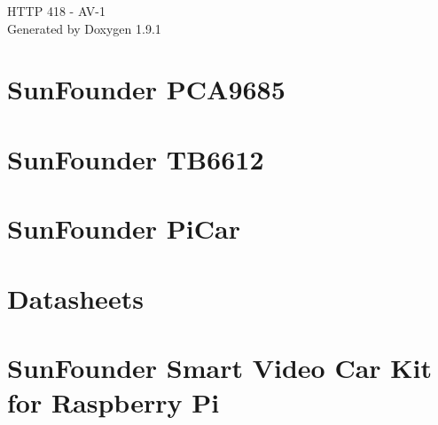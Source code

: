 \let\mypdfximage\pdfximage\def\pdfximage{\immediate\mypdfximage}\documentclass[twoside]{book}
\newcommand{\+}{\discretionary{\mbox{\scriptsize$\hookleftarrow$}}{}{}}
\newcommand{\clearemptydoublepage}{%
  \newpage{\pagestyle{empty}\cleardoublepage}%
}
\begin{document}
\raggedbottom

\hypersetup{pageanchor=false,
             bookmarksnumbered=true,
             pdfencoding=unicode
            }
\begin{titlepage}
\vspace*{7cm}
\begin{center}%
{\Large HTTP 418 -\/ AV-\/1 }\\
\vspace*{1cm}
{\large Generated by Doxygen 1.9.1}\\
\end{center}
\end{titlepage}
\clearemptydoublepage
{}
\tableofcontents
\clearemptydoublepage
{}
\hypersetup{pageanchor=true}

\chapter{Sun\+Founder PCA9685}
\label{md_src_picar__sun_founder__pi_car_picar__sun_founder__p_c_a9685__r_e_a_d_m_e}

\chapter{Sun\+Founder TB6612}
\label{md_src_picar__sun_founder__pi_car_picar__sun_founder__t_b6612__r_e_a_d_m_e}

\chapter{Sun\+Founder Pi\+Car}
\label{md_src_picar__sun_founder__pi_car__r_e_a_d_m_e}

\chapter{Datasheets}
\label{md_src_picar__sun_founder__pi_car__v_datasheet__r_e_a_d_m_e}

\chapter{Sun\+Founder Smart Video Car Kit for Raspberry Pi}
\label{md_src_picar__sun_founder__pi_car__v__r_e_a_d_m_e}

\end{document}

